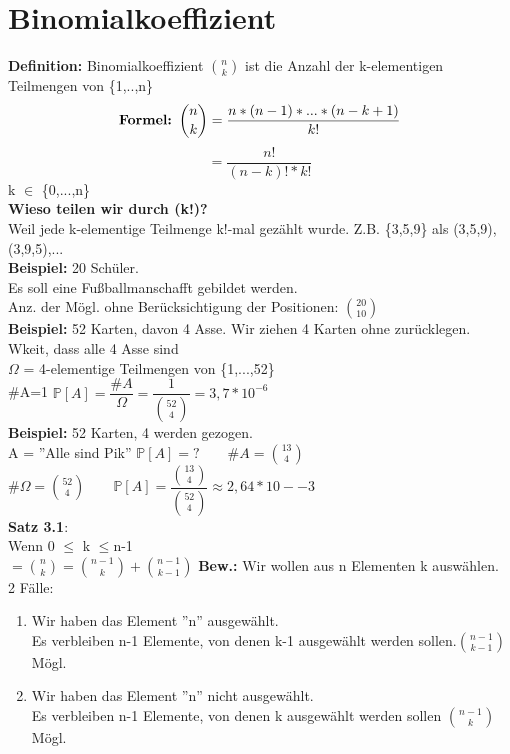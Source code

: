 \section{Binomialkoeffizient}
\textbf{Definition:} Binomialkoeffizient $\binom{n}{k}$ ist die Anzahl der k-elementigen Teilmengen von \{1,..,n\}\medskip\\
 $$\text{\textbf{Formel: }}\binom{n}{k}= \frac{n*(n-1)*...*(n-k+1)}{k!}$$
 $$=\frac{n!}{(n-k)!*k!}$$ k $\in$ \{0,...,n\}\smallskip\\
\textbf{ Wieso teilen wir durch (k!)?}\\
 Weil jede k-elementige Teilmenge k!-mal gezählt wurde. Z.B. \{3,5,9\} als (3,5,9), (3,9,5),...\\
 \textbf{Beispiel:} 20 Schüler.\\Es soll eine Fußballmanschafft gebildet werden.\\
 Anz. der Mögl. ohne Berücksichtigung der Positionen: $\binom{20}{10}$\medskip\\
 \textbf{Beispiel:} 52 Karten, davon 4 Asse. Wir ziehen 4 Karten ohne zurücklegen. Wkeit, dass alle 4 Asse sind\\
 $\Omega$ = 4-elementige Teilmengen von \{1,...,52\}\\
 \#A=1 \hspace{1cm} $\mathds{P}[A]=\dfrac{\#A}{\Omega}=\dfrac{1}{\binom{52}{4}}=3,7*10^{-6}$\medskip\\
 \textbf{Beispiel:} 52 Karten, 4 werden gezogen.\\
 A = ''Alle sind Pik''
 $\mathds{P}[A]= ? \qquad \#A=\binom{13}{4} $\\
 \#$\Omega = \binom{52}{4} \qquad \mathds{P}[A] = \dfrac{\binom{13}{4}}{\binom{52}{4}} \approx 2,64*10-{-3} $\medskip\\
 \textbf{Satz 3.1}:\\ Wenn 0 $\leq$ k $\leq$n-1\\
 $=\binom{n}{k}=\binom{n-1}{k}+\binom{n-1}{k-1}$\newpage
 \textbf{Bew.:} Wir wollen aus n Elementen k auswählen.\\
 2 Fälle:
 \begin{enumerate}
 	\item Wir haben das Element ''n'' ausgewählt. \\ Es verbleiben n-1 Elemente, von denen k-1 ausgewählt werden sollen.$\binom{n-1}{k-1}$ Mögl.
 	\item Wir haben das Element ''n'' nicht ausgewählt.\\
 	Es verbleiben n-1 Elemente, von denen k ausgewählt werden sollen $\binom{n-1}{k}$ Mögl.
 \end{enumerate}
